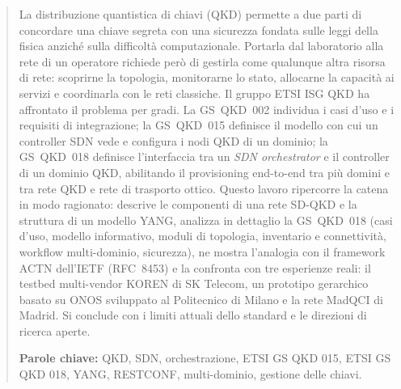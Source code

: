 \begin{abstract}
\noindent
La distribuzione quantistica di chiavi (QKD) permette a due parti di
concordare una chiave segreta con una sicurezza fondata sulle leggi della
fisica anziché sulla difficoltà computazionale. Portarla dal laboratorio
alla rete di un operatore richiede però di gestirla come qualunque altra
risorsa di rete: scoprirne la topologia, monitorarne lo stato, allocarne la
capacità ai servizi e coordinarla con le reti classiche. Il gruppo ETSI ISG
QKD ha affrontato il problema per gradi. La GS~QKD~002 individua i casi
d'uso e i requisiti di integrazione; la GS~QKD~015 definisce il modello con
cui un controller SDN vede e configura i nodi QKD di un dominio; la
GS~QKD~018 definisce l'interfaccia tra un \emph{SDN orchestrator} e il
controller di un dominio QKD, abilitando il provisioning end-to-end tra più
domini e tra rete QKD e rete di trasporto ottico. Questo lavoro ripercorre
la catena in modo ragionato: descrive le componenti di una rete SD-QKD e la
struttura di un modello YANG, analizza in dettaglio la GS~QKD~018 (casi
d'uso, modello informativo, moduli di topologia, inventario e connettività,
workflow multi-dominio, sicurezza), ne mostra l'analogia con il framework
ACTN dell'IETF (RFC~8453) e la confronta con tre esperienze reali: il
testbed multi-vendor KOREN di SK Telecom, un prototipo gerarchico basato su
ONOS sviluppato al Politecnico di Milano e la rete MadQCI di Madrid. Si
conclude con i limiti attuali dello standard e le direzioni di ricerca
aperte.

\medskip
\noindent\textbf{Parole chiave:} QKD, SDN, orchestrazione, ETSI GS QKD 015,
ETSI GS QKD 018, YANG, RESTCONF, multi-dominio, gestione delle chiavi.
\end{abstract}
